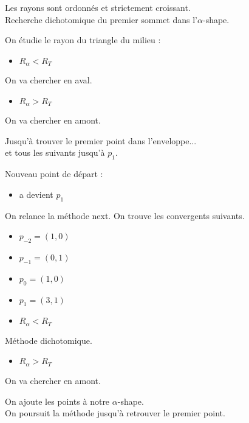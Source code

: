 \documentclass{beamer}
\begin{document}
\begin{frame}
\begin{columns}[t]
\begin{column}{3cm}
\begin{block}{}
{        }
        {
          Les rayons sont ordonnés et strictement croissant.\\
          \alert{Recherche dichotomique} du premier sommet dans l'$\alpha$-shape.\\
        }        
        {
          On étudie le rayon du triangle du milieu :
          \begin{itemize}
            \item $R_{\alpha} < R_T$
          \end{itemize}
          On va chercher en aval.
        }
        {
          \begin{itemize}
            \item $R_{\alpha} > R_T$
          \end{itemize}
          On va chercher en amont.
        }
        {
          Jusqu'à trouver le premier point dans l'enveloppe...\\          
        }
        {
          et tous les suivants jusqu'à $p_1$.     
        }
        {
          Nouveau point de départ : 
          \begin{itemize}
            \item a devient $p_1$ 
          \end{itemize} 
        }
        {
          On relance la méthode next.
          On trouve les convergents suivants.\\
          \begin{itemize}
            \item $p_{-2} = (1, 0)$
            \item $p_{-1} = (0, 1)$
            \item $p_{0} = (1, 0)$
            \item $p_{1} = (3, 1)$
          \end{itemize}
        }
        {
          \begin{itemize}
            \item $R_{\alpha} < R_T$
          \end{itemize}
         Méthode dichotomique.
        }
        {
          \begin{itemize}
            \item $R_{\alpha} > R_T$
          \end{itemize}
          On va chercher en amont.
        }
        {
          On ajoute les points à notre $\alpha$-shape.\\
        }
        {
          On poursuit la méthode jusqu'à retrouver le premier point.
        }  
      \end{block}
     
    \end{column}
  \end{columns}

\end{frame}
\end{document}
